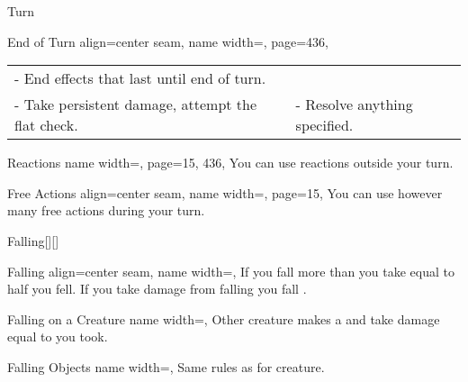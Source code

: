 \begin{PageBackLandscape}
\begin{TablesHalf}{\backTableHeight}
\begin{Table}{Turn}
\begin{entry}{End of Turn}{%
                align=center seam,
                name width=\turnLength,%
                page=436,
            }
\begin{tabular}{@{}ll}
                    - End effects that last until end of turn. \\%
                    - Take persistent damage, attempt the flat check. &
                    - Resolve anything specified.
                \end{tabular}%
            \end{entry}
            \begin{entry}{Reactions}{%
                name width=\turnLength,%
                page={15, 436},
            }
                You can use reactions  outside your turn. \hfill
            \end{entry}
            \begin{entry}{Free Actions}{%
                align=center seam,
                name width=\turnLength,%
                page=15,
            }
                You can use however many free actions during your turn. \hfill
            \end{entry}
        \end{Table}\TableSpace
        \begin{Table}{Falling}[][]
            \begin{entry}{Falling}{%
                align=center seam,
                name width=\turnLength,}
                If you fall more than  \Feet you take  equal to half you fell.\hfill
                If you take damage from falling you fall \Prone.\\
            \end{entry}
            \begin{entry}{Falling on a Creature}{%
                name width=\turnLength,}
                Other creature makes a \Reflex[][val=15] and take damage equal to     you took.
            \end{entry}
            \begin{entry}{Falling Objects}{%
                name width=\turnLength,}
                Same rules as for creature. \hfill
            \end{entry}

\end{Table}
\end{TablesHalf}
\end{PageBackLandscape}
